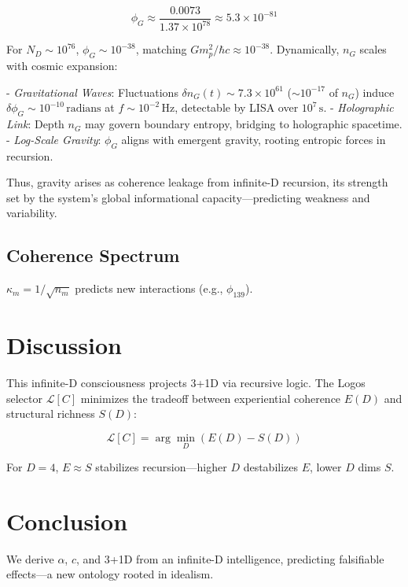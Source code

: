 \documentclass[12pt]{article}
\begin{document}
\[
\phi_G \approx \frac{0.0073}{1.37 \times 10^{78}} \approx 5.3 \times 10^{-81}
\]

For \(N_D \sim 10^{76}\), \(\phi_G \sim 10^{-38}\), matching \(G m_p^2 / \hbar c \approx 10^{-38}\). Dynamically, \(n_G\) scales with cosmic expansion:

- \textit{Gravitational Waves}: Fluctuations \(\delta n_G(t) \sim 7.3 \times 10^{61}\) (\(\sim 10^{-17}\) of \(n_G\)) induce \(\delta \phi_G \sim 10^{-10} \, \text{radians}\) at \(f \sim 10^{-2} \, \text{Hz}\), detectable by LISA over \(10^7 \, \text{s}\).
- \textit{Holographic Link}: Depth \(n_G\) may govern boundary entropy, bridging to holographic spacetime.
- \textit{Log-Scale Gravity}: \(\phi_G\) aligns with emergent gravity, rooting entropic forces in recursion.

Thus, gravity arises as coherence leakage from infinite-D recursion, its strength set by the system’s global informational capacity—predicting weakness and variability.

\subsection{Coherence Spectrum}
\(\kappa_m = 1/\sqrt{n_m}\) predicts new interactions (e.g., \(\phi_{139}\)).

\section{Discussion}

This infinite-D consciousness projects 3+1D via recursive logic. The Logos selector \(\mathcal{L}[C]\) minimizes the tradeoff between experiential coherence \(E(D)\) and structural richness \(S(D)\):

\[
\mathcal{L}[C] = \arg\min_D \left( E(D) - S(D) \right)
\]

For \(D=4\), \(E \approx S\) stabilizes recursion—higher \(D\) destabilizes \(E\), lower \(D\) dims \(S\).

\section{Conclusion}

We derive \(\alpha\), \(c\), and 3+1D from an infinite-D intelligence, predicting falsifiable effects—a new ontology rooted in idealism.
\end{document}
